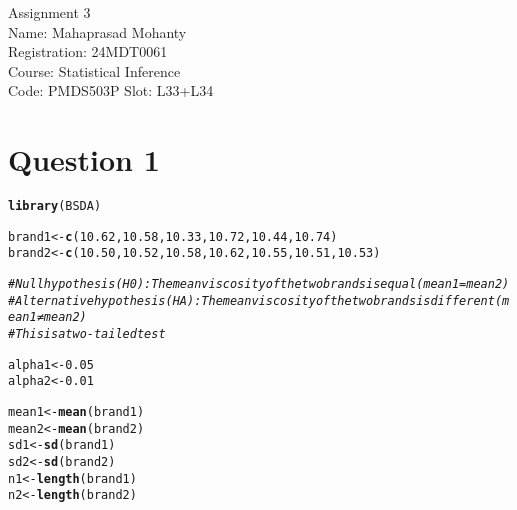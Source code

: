 \documentclass{article}\usepackage[]{graphicx}\usepackage[]{xcolor}
\makeatletter
\newcommand{\hlnum}[1]{\textcolor[rgb]{0.686,0.059,0.569}{#1}}%
\newcommand{\hlcom}[1]{\textcolor[rgb]{0.678,0.584,0.686}{\textit{#1}}}%
\newcommand{\hldef}[1]{\textcolor[rgb]{0.345,0.345,0.345}{#1}}%
\newcommand{\hlkwb}[1]{\textcolor[rgb]{0.69,0.353,0.396}{#1}}%
\newcommand{\hlkwd}[1]{\textcolor[rgb]{0.737,0.353,0.396}{\textbf{#1}}}%
\newenvironment{kframe}{%
 \def\at@end@of@kframe{}%
 \ifinner\ifhmode%
  \def\at@end@of@kframe{\end{minipage}}%
  \begin{minipage}{\columnwidth}%
 \fi\fi%
 \def\FrameCommand##1{\hskip\@totalleftmargin \hskip-\fboxsep
 \colorbox{shadecolor}{##1}\hskip-\fboxsep
     \hskip-\linewidth \hskip-\@totalleftmargin \hskip\columnwidth}%
 \MakeFramed {\advance\hsize-\width
   \@totalleftmargin\z@ \linewidth\hsize
   \@setminipage}}%
 {\par\unskip\endMakeFramed%
 \at@end@of@kframe}
\newenvironment{knitrout}{}{} %
\makeatother
\begin{document}
\begin{center}
Assignment 3 \\
Name: Mahaprasad Mohanty \\
Registration: 24MDT0061 \\
Course: Statistical Inference \\
Code: PMDS503P
Slot: L33+L34
\end{center}

\section{Question 1}
\begin{knitrout}
\color{fgcolor}\begin{kframe}
\begin{alltt}
\hlkwd{library}\hldef{(BSDA)}
\end{alltt}


{\ttfamily\noindent\itshape\color{messagecolor}{\#\# Loading required package: lattice}}

{\ttfamily\noindent\itshape\color{messagecolor}{\#\# \\\#\# Attaching package: 'BSDA'}}

{\ttfamily\noindent\itshape\color{messagecolor}{\#\# The following object is masked from 'package:datasets':\\\#\# \\\#\# \ \ \ \ Orange}}\begin{alltt}
\hldef{brand1} \hlkwb{<-} \hlkwd{c}\hldef{(}\hlnum{10.62}\hldef{,} \hlnum{10.58}\hldef{,} \hlnum{10.33}\hldef{,} \hlnum{10.72}\hldef{,} \hlnum{10.44}\hldef{,} \hlnum{10.74}\hldef{)}
\hldef{brand2} \hlkwb{<-} \hlkwd{c}\hldef{(}\hlnum{10.50}\hldef{,} \hlnum{10.52}\hldef{,} \hlnum{10.58}\hldef{,} \hlnum{10.62}\hldef{,} \hlnum{10.55}\hldef{,} \hlnum{10.51}\hldef{,} \hlnum{10.53}\hldef{)}

\hlcom{# Null hypothesis (H0): The mean viscosity of the two brands is equal (mean1 = mean2)}
\hlcom{# Alternative hypothesis (HA): The mean viscosity of the two brands is different (mean1 ≠ mean2)}
\hlcom{# This is a two-tailed test}

\hldef{alpha1} \hlkwb{<-} \hlnum{0.05}
\hldef{alpha2} \hlkwb{<-} \hlnum{0.01}


\hldef{mean1} \hlkwb{<-} \hlkwd{mean}\hldef{(brand1)}
\hldef{mean2} \hlkwb{<-} \hlkwd{mean}\hldef{(brand2)}
\hldef{sd1} \hlkwb{<-} \hlkwd{sd}\hldef{(brand1)}
\hldef{sd2} \hlkwb{<-} \hlkwd{sd}\hldef{(brand2)}
\hldef{n1} \hlkwb{<-} \hlkwd{length}\hldef{(brand1)}
\hldef{n2} \hlkwb{<-} \hlkwd{length}\hldef{(brand2)}


\end{alltt}
\end{kframe}
\end{knitrout}
\end{document}
